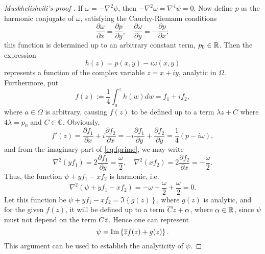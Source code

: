 \begin{proof}[Muskhelishvili's proof \cite{Mus19}]
If $\omega=-\nabla^2 \psi$, then $-\nabla^2\omega = \nabla^4\psi = 0$. Now define $p$ as the harmonic conjugate of $\omega$, satisfying the Cauchy-Riemann conditions
\begin{equation}
\frac{\partial\omega}{\partial x} = \frac{\partial p}{\partial y}, \quad
\frac{\partial\omega}{\partial y} = -\frac{\partial p}{\partial x};
\end{equation}
this function is determined up to an arbitrary constant term, $p_0\in\mathbb{R}$. Then the expression
\begin{equation}
h(z) = p(x,y)-i\omega(x,y)
\end{equation}
represents a function of the complex variable $z=x+iy$, analytic in $\Omega$. Furthermore, put
\begin{equation}
f(z) := \frac{1}{4} \int_a^z h(w) dw = f_1 + if_2,
\end{equation}
where $a\in\Omega$ is arbitrary, causing $f(z)$ to be defined up to a term $\lambda z +C$ where $4\lambda=p_0$ and $C\in\mathbb{C}$.
Obviously,
\begin{equation}\label{eq:fprime}
f'(z) = \frac{\partial f_1}{\partial x} + i \frac{\partial f_2}{\partial x} = -i \frac{\partial f_1}{\partial y} + \frac{\partial f_2}{\partial y} = \frac{1}{4} \left(p-i\omega\right),
\end{equation}
and from the imaginary part of \eqref{eq:fprime}, we may write
\begin{equation}
\nabla^2\left(y f_1\right) = 2\frac{\partial f_1}{\partial y} = \frac{\omega}{2},\quad \nabla^2\left(x f_2\right) = 2\frac{\partial f_2}{\partial x} = -\frac{\omega}{2}.
\end{equation}
Thus, the function $\psi + yf_1 - xf_2$ is harmonic, i.e.
\begin{equation}
\nabla^2 \left(\psi + yf_1 - xf_2\right) = -\omega + \frac{\omega}{2} + \frac{\omega}{2} =0.
\end{equation}
Let this function be $\psi + yf_1 - xf_2 = \Im\left\{g(z)\right\}$, where $g(z)$ is analytic, and for the given $f(z)$, it will be defined up to a term ${\overline{C}}z+\alpha$, where $\alpha\in\mathbb{R}$, since $\psi$ must not depend on the term $C{\overline{z}}$. Hence one can represent
\begin{equation}
\psi = \Im\left\{{\overline{z}}f(z) + g(z)\right\}.
\end{equation}
This argument can be used to establish the analyticity of $\psi$.
\end{proof}
